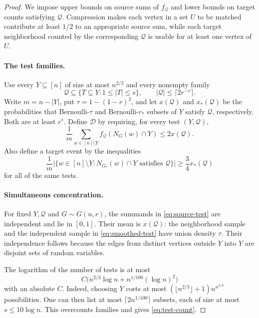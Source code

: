 \documentclass[11pt]{article}
\theoremstyle{remark}
\numberwithin{equation}{section}
\newcommand{\calD}{\mathcal D}
\newcommand{\calQ}{\mathcal Q}
\begin{document}
\begin{proof}
We impose upper bounds on source sums of $f_{\calQ}$ and lower
bounds on target counts satisfying $\calQ$. Compression makes
each vertex in a set $U$ to be matched contribute at least $1/2$
to an appropriate source sum, while each target neighborhood
counted by the corresponding $\calQ$ is usable for at least one
vertex of $U$.

\paragraph{The test families.}
Use every $Y\subseteq[n]$ of size at most $n^{2/3}$ and every
nonempty family
\[
 \calQ\subseteq\{T\subseteq Y:1\leq|T|\leq s\},
 \qquad |\calQ|\leq\lceil2r^{-s}\rceil.
\]
Write $m=n-|Y|$, put $\tau=1-(1-r)^2$, and let
$x(\calQ)$ and $x_*(\calQ)$ be the probabilities that
Bernoulli-$\tau$ and Bernoulli-$r_*$ subsets of $Y$ satisfy
$\calQ$, respectively. Both are at least $r^s$.
Define $\calD$ by requiring, for every test $(Y,\calQ)$,
\begin{equation}\label{eq:source-test}
 \frac1m\sum_{w\in[n]\setminus Y}
 f_{\calQ}(N_G(w)\cap Y)\leq2x(\calQ).
\end{equation}
Also define a target event by the inequalities
\begin{equation}\label{eq:target-test}
 \frac1m\bigl|\{w\in[n]\setminus Y:
       N_{G_*}(w)\cap Y\text{ satisfies }\calQ\}\bigr|
 \geq\frac34x_*(\calQ)
\end{equation}
for all of the same tests.

\paragraph{Simultaneous concentration.}
For fixed $Y,\calQ$ and $G\sim G(n,r)$, the summands in
\eqref{eq:source-test} are independent and lie in $[0,1]$.
Their mean is $x(\calQ)$: the neighborhood sample and the
independent sample in \eqref{eq:smoothed-test} have union
density $\tau$. Their independence follows because the edges
from distinct vertices outside $Y$ into $Y$ are disjoint sets
of random variables.

The logarithm of the number of tests is at most
\begin{equation}\label{eq:test-count}
 C\bigl(n^{2/3}\log n+n^{1/100}(\log n)^2\bigr)
\end{equation}
with an absolute $C$. Indeed, choosing $Y$ costs at most
$(\lfloor n^{2/3}\rfloor+1)n^{n^{2/3}}$ possibilities.
One can then list at most $\lceil2n^{1/100}\rceil$ subsets,
each of size at most $s\leq10\log n$. This overcounts families
and gives \eqref{eq:test-count}.


\end{proof}
\end{document}
